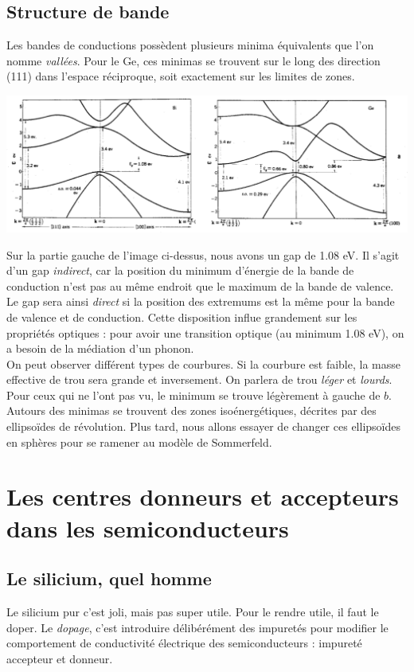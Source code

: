 		\subsection{Structure de bande}
		Les bandes de conductions possèdent plusieurs minima équivalents que l'on 
		nomme \textit{vallées}. Pour le Ge, ces minimas se trouvent sur le long des 
		direction (111) dans l'espace réciproque, soit exactement sur les limites 
		de zones.
		\begin{center}
		\includegraphics[scale=0.4]{ch8/image2.png}
		\end{center}				
		Sur la partie gauche de l'image ci-dessus, nous avons un gap de 1.08 eV. 
		Il s'agit d'un gap \textit{indirect}, car la position du minimum d'énergie 
		de la bande de conduction n'est pas au même endroit que le maximum de la 
		bande de valence.
		Le gap sera ainsi \textit{direct} si la position des extremums est la même 
		pour la bande de valence et de conduction.
		Cette disposition influe grandement sur les propriétés optiques : pour avoir 
		une transition optique (au minimum 1.08 eV), on a besoin de la médiation 
		d'un phonon.\\
		On peut observer différent types de courbures. Si la courbure est faible, 
		la masse effective de trou sera grande et inversement. On parlera de 
		trou \textit{léger} et \textit{lourds}. Pour ceux qui ne l'ont pas vu, le 
		minimum se trouve légèrement à gauche de $b$.\\
		
		Autours des minimas se trouvent des zones isoénergétiques, décrites par des 
		ellipsoïdes de révolution. Plus tard, nous allons essayer de changer ces 
		ellipsoïdes en sphères pour se ramener au modèle de Sommerfeld.
		
	\section{Les centres donneurs et accepteurs dans les semiconducteurs}
		\subsection{Le silicium, quel homme}
		Le silicium pur c'est joli, mais pas super utile. Pour le rendre utile, 
		il faut le doper. Le \textit{dopage}, c'est introduire délibérément des 
		impuretés pour modifier le comportement de conductivité électrique des 
		semiconducteurs : impureté accepteur et donneur.\\
		
